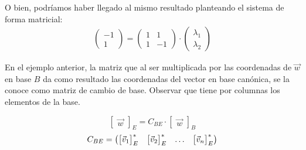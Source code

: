 \begin{mdframed}[style=ExampleFrame]
    O bien, podríamos haber llegado al mismo resultado planteando el sistema de forma matricial:
    \begin{gather*}
        \begin{pmatrix}
            -1
            \\
            1
        \end{pmatrix}
        =
        \begin{pmatrix}
            1 & 1
            \\
            1 & -1
        \end{pmatrix}
        \cdot
        \begin{pmatrix}
            \lambda_1
            \\
            \lambda_2
        \end{pmatrix}
    \end{gather*}
\end{mdframed}

En el ejemplo anterior, la matriz que al ser multiplicada por las coordenadas de $\Vec{w}$ en base $B$ da como resultado las coordenadas del vector en base canónica, se la conoce como matriz de cambio de base.
Observar que tiene por columnas los elementos de la base.

\begin{mdframed}[style=DefinitionFrame]
    \begin{defn}
        \label{defn:C_BE}
    \end{defn}
    \begin{equation*}
        \begin{bmatrix}
            \Vec{w}
        \end{bmatrix}_E
        = C_{BE} \cdot
        \begin{bmatrix}
            \Vec{w}
        \end{bmatrix}_B
    \end{equation*}
    \begin{equation*}
        C_{BE} =
        \begin{pmatrix}
            { \begin{bmatrix} \Vec{v}_1 \end{bmatrix} }_E^* & { \begin{bmatrix} \Vec{v}_2 \end{bmatrix} }_E^* & \dots & { \begin{bmatrix} \Vec{v}_n \end{bmatrix} }_E^*
        \end{pmatrix}
    \end{equation*}
\end{mdframed}

